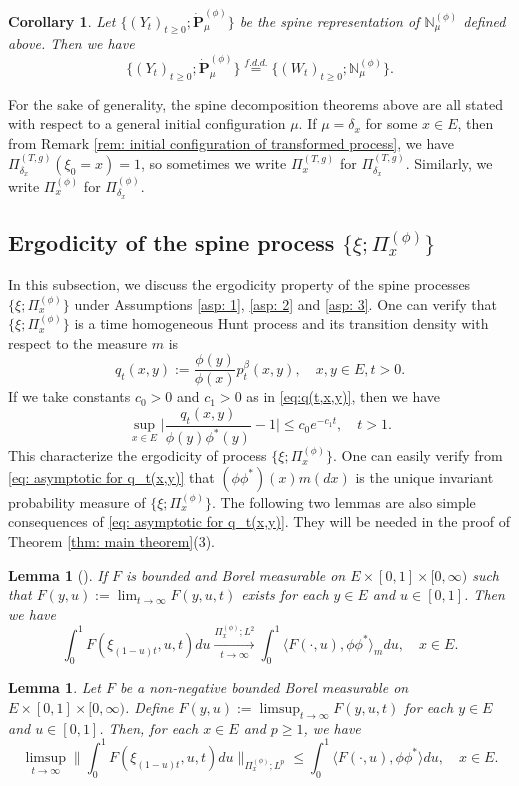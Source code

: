 \documentclass[12pt, a4paper]{amsart}
\newtheorem{lem}[thm]{Lemma}
\newtheorem{cro}[thm]{Corollary}
\theoremstyle{definition}
\numberwithin{equation}{section}
\begin{document}
\begin{cro}
	Let $\{(Y_t)_{t\geq 0}; \dot {\mathbf P}^{(\phi)}_\mu\}$ be the spine representation of $\mathbb N^{(\phi)}_\mu$ defined above.
	Then we have
\[
	\{(Y_t)_{t\geq 0}; \dot{\mathbf P}^{(\phi)}_\mu\}
	\overset{f.d.d.}{=} \{(W_t)_{t\geq 0}; \mathbb N_\mu^{(\phi)}\}.
\]
\end{cro}

	For the sake of generality, the spine decomposition theorems above are all stated with respect to a general initial configuration $\mu$.
	If $\mu = \delta_x$ for some $x\in E$, then from Remark \ref{rem: initial configuration of transformed process}, we have $\Pi_{\delta_x}^{(T,g)} (\xi_0 = x) = 1$, so sometimes we write $\Pi_x^{(T,g)}$ for $\Pi_{\delta_x}^{(T,g)}$. 
	Similarly, we write $\Pi_x^{(\phi)}$ for $\Pi_{\delta_x}^{(\phi)}$.

\subsection{Ergodicity of the spine process $\{\xi; \Pi^{(\phi)}_x\}$}
\label{sec: Ergodicity}
	In this subsection, we discuss the ergodicity property of the spine processes $\{\xi; \Pi^{(\phi)}_x\}$ under Assumptions \ref{asp: 1}, \ref{asp: 2} and \ref{asp: 3}.
	One can verify that $\{\xi; \Pi^{(\phi)}_x\}$ is a time homogeneous Hunt process and its transition density with respect to the measure $m$ is
\[
	q_t(x,y) := \frac{\phi(y)}{\phi(x)} p^\beta_t(x,y),
	\quad x,y\in E, t>0.
\]
	If we take constants $c_0>0$ and $c_1>0$ as in \eqref{eq:q(t,x,y)}, then we have
\[\label{eq: asymptotic for q_t(x,y)}
	\sup_{x\in E} \Big| \frac{q_t(x,y)}{\phi(y)\phi^*(y)} - 1\Big| 
	\leq c_0 e^{-c_1 t},
	\quad t > 1.
\]
	This characterize the ergodicity of process $\{\xi; \Pi^{(\phi)}_x\}$.
	One can easily verify from \eqref{eq: asymptotic for q_t(x,y)} that $(\phi\phi^*)(x)m(dx)$ is the unique invariant probability measure of $\{\xi; \Pi^{(\phi)}_x\}$.
	The following two lemmas are also simple consequences of \eqref{eq: asymptotic for q_t(x,y)}. 
	They will be needed in the proof of  Theorem \ref{thm: main theorem}(3).
\begin{lem}[{\cite[Lemma 5.6]{RenSongSun2017Spine}}] \label{lem: ergodicity of the underlying process}
	If $F$ is bounded and Borel measurable on $E\times [0,1]\times [0,\infty)$ such that $F(y,u):= \lim_{t\to \infty} F(y,u,t)$ exists for each $y\in E$ and $u \in [0,1]$. 
	Then we have
\[
	\int_0^1 F(\xi_{(1-u)t},u,t) du 
	\xrightarrow[t\to \infty]{\Pi_x^{(\phi)} ; L^2} \int_0^1 \langle F(\cdot , u), \phi\phi^*\rangle_m du,
	\quad x\in E.
\]
\end{lem}
\begin{lem}\label{lem: Fatou-ergodic lemma for the uderlying process}
	Let $F$ be a non-negative bounded Borel measurable on $E\times [0,1]\times [0,\infty)$. 
	Define $F(y,u):= \limsup_{t\to \infty} F(y,u,t)$ for each $y\in E$ and $u \in [0,1]$. 
	Then, for each $x\in E$ and $p \geq 1$, we have
\[
	\limsup_{ t \to \infty}  \Big\| \int_0^1 F(\xi_{(1-u) t },u,t) du  \Big\|_{\Pi_x^{(\phi)};L^p}
	\leq \int_0^1 \langle F(\cdot, u), \phi \phi^*\rangle du, 
	\quad x\in E.
\]
\end{lem}
\end{document}
